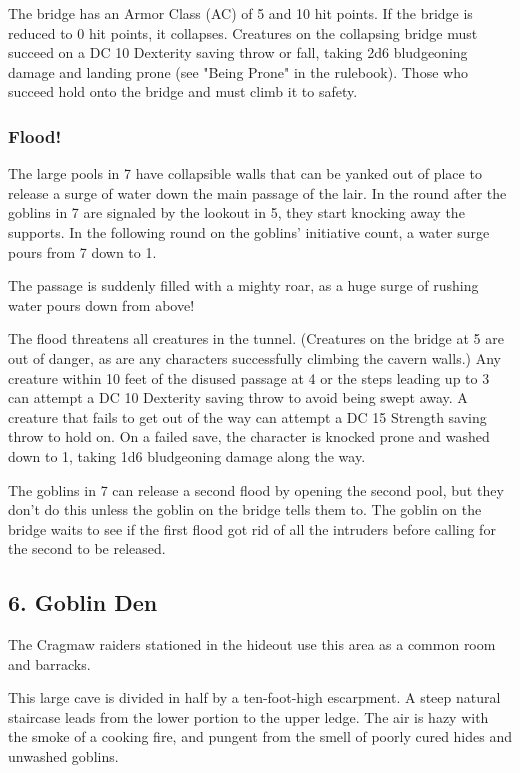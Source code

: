 \documentclass[10pt,a4paper,twoside,bg=print,twocolumn,openany,nodeprecatedcode]{dndbook}
\begin{document}
The bridge has an Armor Class (AC) of 5 and 10 hit points. If the bridge is reduced to 0 hit points, it collapses. Creatures on the collapsing bridge must succeed on a DC 10 Dexterity saving throw or fall, taking 2d6 bludgeoning damage and landing prone (see "Being Prone" in the rulebook). Those who succeed hold onto the bridge and must climb it to safety.

\subsubsection{Flood!}
The large pools in 7 have collapsible walls that can be yanked out of place to release a surge of water down the main passage of the lair. In the round after the goblins in 7 are signaled by the lookout in 5, they start knocking away the supports. In the following round on the goblins' initiative count, a water surge pours from 7 down to 1.

\begin{DndReadAloud}{}
The passage is suddenly filled with a mighty roar, as a huge surge of rushing water pours down from above!

\end{DndReadAloud}

The flood threatens all creatures in the tunnel. (Creatures on the bridge at 5 are out of danger, as are any characters successfully climbing the cavern walls.) Any creature within 10 feet of the disused passage at 4 or the steps leading up to 3 can attempt a DC 10 Dexterity saving throw to avoid being swept away. A creature that fails to get out of the way can attempt a DC 15 Strength saving throw to hold on. On a failed save, the character is knocked prone and washed down to 1, taking 1d6 bludgeoning damage along the way.

The goblins in 7 can release a second flood by opening the second pool, but they don't do this unless the goblin on the bridge tells them to. The goblin on the bridge waits to see if the first flood got rid of all the intruders before calling for the second to be released.

\subsection{6. Goblin Den}
The Cragmaw raiders stationed in the hideout use this area as a common room and barracks.

\begin{DndReadAloud}{}
This large cave is divided in half by a ten-foot-high escarpment. A steep natural staircase leads from the lower portion to the upper ledge. The air is hazy with the smoke of a cooking fire, and pungent from the smell of poorly cured hides and unwashed goblins.

\end{DndReadAloud}
\end{document}
